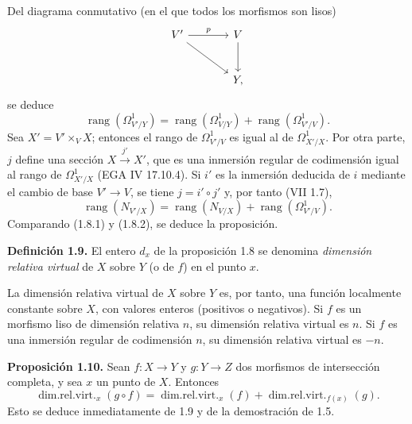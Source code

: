 Del diagrama conmutativo (en el que todos los morfismos son lisos)
\[
\begin{tikzcd}[column sep=large,row sep=large]
\sisi{V}{V'} \arrow[r,"p"] \arrow[dr] & \sisi{V'}{V} \arrow[d]\\ %
& Y,
\end{tikzcd}
\]
se deduce
\begin{equation}\tag{1.8.1}
\operatorname{rang}(\Omega^1_{V'/Y})=
\operatorname{rang}(\Omega^1_{V/Y})+
\operatorname{rang}(\Omega^1_{V'/V}).
\end{equation}
Sea $X'=V'\times_V X$; entonces el rango de $\Omega^1_{V'/V}$ es igual al de
$\Omega^1_{X'/X}$. Por otra parte, $j$ define una sección
$X\xrightarrow{j'} X'$, que es una inmersión regular de codimensión igual al
rango de $\Omega^1_{X'/X}$ (EGA IV 17.10.4). Si $i'$ es la inmersión deducida
de $i$ mediante el cambio de base $V'\to V$, se tiene $j=i'\circ j'$ y, por
tanto (VII 1.7),
\begin{equation}\tag{1.8.2}
\operatorname{rang}(N_{V'/X})=
\operatorname{rang}(N_{V/X})+
\operatorname{rang}(\Omega^1_{V'/V}).
\end{equation}
Comparando (1.8.1) y (1.8.2), se deduce la proposición.

\textbf{Definición 1.9.} El entero $d_x$ de la proposición 1.8 se denomina
\emph{dimensión relativa virtual} de $X$ sobre $Y$ (o de $f$) en el punto
$x$.

La dimensión relativa virtual de $X$ sobre $Y$ es, por tanto, una función
localmente constante sobre $X$, con valores enteros (positivos o negativos).
Si $f$ es un morfismo liso de dimensión relativa $n$, su dimensión relativa
virtual es $n$. Si $f$ es una inmersión regular de codimensión $n$, su
dimensión relativa virtual es $-n$.

\textbf{Proposición 1.10.} Sean $f:X\to Y$ y $g:Y\to Z$ dos morfismos de
intersección completa, y sea $x$ un punto de $X$. Entonces
\[
\operatorname{dim.rel.virt.}_x(g\circ f)=
\operatorname{dim.rel.virt.}_x(f)+
\operatorname{dim.rel.virt.}_{f(x)}(g).
\]
Esto se deduce inmediatamente de 1.9 y de la demostración de 1.5.
